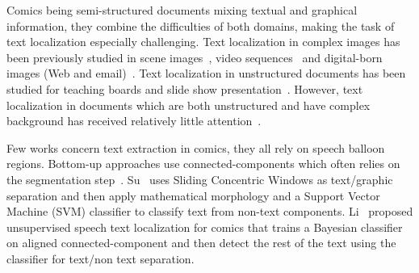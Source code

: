 Comics being semi-structured documents mixing textual and graphical information, they combine the difficulties of both domains, making the task of text localization especially challenging.
Text localization in complex images has been previously studied in scene images~\cite{Weinman09,Epshtein10,Neumann12,Wang10,Meng12}, video sequences~\cite{Wonjun09,Shivakumara09} and digital-born images (Web and email)~\cite{Karatzas07}. 
Text localization in unstructured documents has been studied for teaching boards and slide show presentation~\cite{Oliveira10,Vajda2012Method,Nguyen2013BagOfSubjects}.
However, text localization in documents which are both unstructured and have complex background has received relatively little attention~\cite{Clavelli09}.

Few works concern text extraction in comics, they all rely on speech balloon regions.
Bottom-up approaches use connected-components which often relies on the segmentation step~\cite{ponsard2012ocr}.
Su~\cite{Su11} uses Sliding Concentric Windows as text/graphic separation and then apply mathematical morphology and a Support Vector Machine (SVM) classifier to classify text from non-text components. 
Li~\cite{Li2013Unsupervised} proposed unsupervised speech text localization for comics that trains a Bayesian classifier on aligned connected-component and then detect the rest of the text using the classifier for text/non text separation.
 

